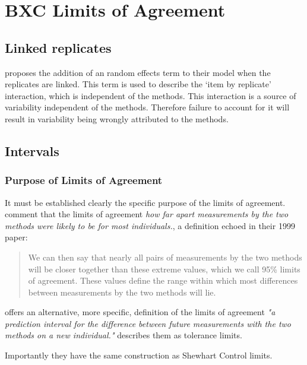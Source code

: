 \documentclass[12pt, a4paper]{report}
\theoremstyle{plain}
\theoremstyle{definition}
\theoremstyle{remark}
\begin{document}
	
	
	\chapter{BXC Limits of Agreement}
	
	
		\section{Linked replicates}
		
		\citet{BXC2008} proposes the addition of an random effects term to their model when the replicates are linked. This term is used to describe the `item by replicate' interaction, which is independent of the methods. This interaction is a source of variability independent of the methods. Therefore failure to account for it will result in variability being wrongly attributed to the methods.
		
	
	\section{Intervals}
	
	\subsection{Purpose of Limits of Agreement} It must be established
	clearly the specific purpose of the limits of agreement.
	\citet*{BA95} comment that the limits of agreement \emph{how far
		apart measurements by the two methods were likely to be for most
		individuals.}, a definition echoed in their 1999 paper:
	\begin{quote} We can then say that nearly all pairs
		of measurements by the two methods will be closer together than
		these extreme values, which we call 95\% limits of agreement.
		These values define the range within which most differences
		between measurements by the two methods will lie\citep{BA99}.
	\end{quote}
	\citet{BXC} offers an alternative, more specific,  definition of
	the limits of agreement \emph{"a prediction interval for the
		difference between future measurements with the two methods on a
		new individual."} \citet{luiz} describes them as tolerance limits.
	
	Importantly they have the same construction as Shewhart Control
	limits.
	
	
	
\end{document}
